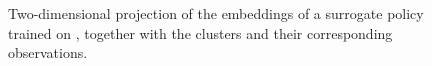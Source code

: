 \begin{figure}[t]
    \caption[Two-dimensional projection of an  for \SpaceInvadersName.]{Two-dimensional projection of the  embeddings of a surrogate policy trained on \SpaceInvadersName, together with the  clusters and their corresponding observations.}
    \label{fig:space_invaders_projection}
\end{figure}
